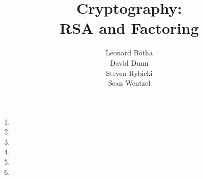 \documentclass[12pt,a4paper]{article}
\title{{\bf Cryptography:}\\
RSA and Factoring}
\author{Leonard Botha \\
David Dunn \\
Steven Rybicki\\
Sean Wentzel}
\begin{document}
\maketitle
\begin{enumerate}
\item 
\item 
\item 
\item 
\item 
\item 
\end{enumerate}

\end{document}
